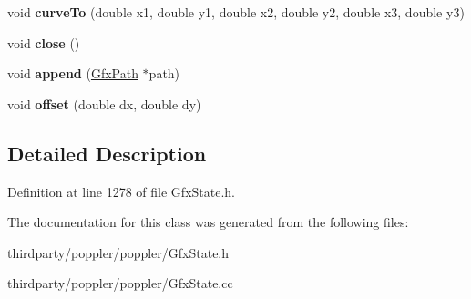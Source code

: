 \begin{DoxyCompactItemize}
void {\bfseries curve\+To} (double x1, double y1, double x2, double y2, double x3, double y3)
\item 
\mbox{\label{class_gfx_path_ad2af31cd6ad201a20c7bb42db1bbd52b}} 
void {\bfseries close} ()
\item 
\mbox{\label{class_gfx_path_a4109bae25a8da09823c3acfc93cf73f0}} 
void {\bfseries append} (\hyperlink{class_gfx_path}{Gfx\+Path} $\ast$path)
\item 
\mbox{\label{class_gfx_path_a1be31bea8ac0abbae629bbb4eba6a3d6}} 
void {\bfseries offset} (double dx, double dy)
\end{DoxyCompactItemize}


\subsection{Detailed Description}


Definition at line 1278 of file Gfx\+State.\+h.



The documentation for this class was generated from the following files\+:\begin{DoxyCompactItemize}
\item 
thirdparty/poppler/poppler/Gfx\+State.\+h\item 
thirdparty/poppler/poppler/Gfx\+State.\+cc\end{DoxyCompactItemize}
